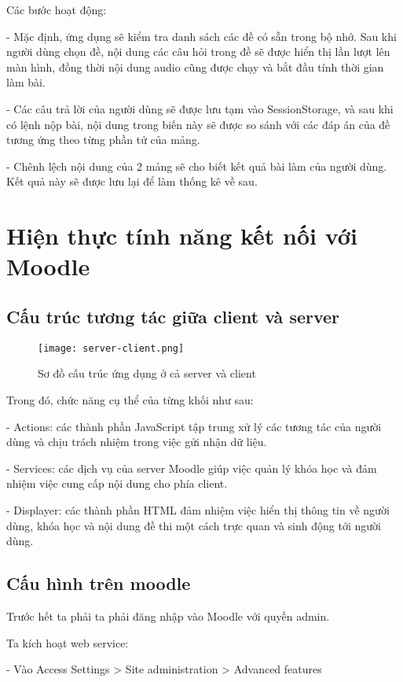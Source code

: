 Các bước hoạt động:

\quad - Mặc định, ứng dụng sẽ kiểm tra danh sách các đề có sẵn trong bộ nhớ. Sau khi người dùng chọn đề, nội dung các câu hỏi trong đề sẽ được hiển thị lần lượt lên màn hình, đồng thời nội dung audio cũng được chạy và bắt đầu tính thời gian làm bài.

\quad - Các câu trả lời của người dùng sẽ được lưu tạm vào SessionStorage, và sau khi có lệnh nộp bài, nội dung trong biến này sẽ được so sánh với các đáp án của đề tương ứng theo từng phần tử của mảng.

\quad - Chênh lệch nội dung của 2 mảng sẽ cho biết kết quả bài làm của người dùng. Kết quả này sẽ được lưu lại để làm thống kê về sau.


\section{Hiện thực tính năng kết nối với Moodle}
\subsection{Cấu trúc tương tác giữa client và server}

\begin{figure}[!htb] 
\centering
\texttt{[image: server-client.png]}
\caption{Sơ đồ cấu trúc ứng dụng ở cả server và client}
\end{figure}

Trong đó, chức năng cụ thể của từng khối như sau:

\quad - Actions: các thành phần JavaScript tập trung xử lý các tương tác của người dùng và chịu trách nhiệm trong việc gửi nhận dữ liệu.

\quad - Services: các dịch vụ của server Moodle giúp việc quản lý khóa học và đảm nhiệm việc cung cấp nội dung cho phía client.

\quad - Displayer: các thành phần HTML đảm nhiệm việc hiển thị thông tin về người dùng, khóa học và nội dung đề thi một cách trực quan và sinh động tới người dùng.

\subsection{Cấu hình trên moodle}

Trước hết ta phải ta phải đăng nhập vào Moodle với quyền admin.

Ta kích hoạt web service:

\quad - Vào Access Settings > Site administration > Advanced features
 
